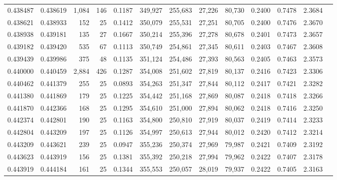 \begin{tabular}{rrrrrrrrrrrrr}
0.438487 & 0.438619 & 1,084 & 146 &                                     0.1187 & 349,927 & 255,683 &  27,226 &  80,730 & 0.2400 & 0.7478 & 2.3684 \\
0.438621 & 0.438933 &   152 &  25 &                                     0.1412 & 350,079 & 255,531 &  27,251 &  80,705 & 0.2400 & 0.7476 & 2.3670 \\
0.438938 & 0.439181 &   135 &  27 &                                     0.1667 & 350,214 & 255,396 &  27,278 &  80,678 & 0.2401 & 0.7473 & 2.3657 \\
0.439182 & 0.439420 &   535 &  67 &                                     0.1113 & 350,749 & 254,861 &  27,345 &  80,611 & 0.2403 & 0.7467 & 2.3608 \\
0.439439 & 0.439986 &   375 &  48 &                                     0.1135 & 351,124 & 254,486 &  27,393 &  80,563 & 0.2405 & 0.7463 & 2.3573 \\
0.440000 & 0.440459 & 2,884 & 426 &                                     0.1287 & 354,008 & 251,602 &  27,819 &  80,137 & 0.2416 & 0.7423 & 2.3306 \\
0.440462 & 0.441379 &   255 &  25 &                                     0.0893 & 354,263 & 251,347 &  27,844 &  80,112 & 0.2417 & 0.7421 & 2.3282 \\
0.441380 & 0.441869 &   179 &  25 &                                     0.1225 & 354,442 & 251,168 &  27,869 &  80,087 & 0.2418 & 0.7418 & 2.3266 \\
0.441870 & 0.442366 &   168 &  25 &                                     0.1295 & 354,610 & 251,000 &  27,894 &  80,062 & 0.2418 & 0.7416 & 2.3250 \\
0.442374 & 0.442801 &   190 &  25 &                                     0.1163 & 354,800 & 250,810 &  27,919 &  80,037 & 0.2419 & 0.7414 & 2.3233 \\
0.442804 & 0.443209 &   197 &  25 &                                     0.1126 & 354,997 & 250,613 &  27,944 &  80,012 & 0.2420 & 0.7412 & 2.3214 \\
0.443209 & 0.443621 &   239 &  25 &                                     0.0947 & 355,236 & 250,374 &  27,969 &  79,987 & 0.2421 & 0.7409 & 2.3192 \\
0.443623 & 0.443919 &   156 &  25 &                                     0.1381 & 355,392 & 250,218 &  27,994 &  79,962 & 0.2422 & 0.7407 & 2.3178 \\
0.443919 & 0.444184 &   161 &  25 &                                     0.1344 & 355,553 & 250,057 &  28,019 &  79,937 & 0.2422 & 0.7405 & 2.3163 \\

\end{tabular}
